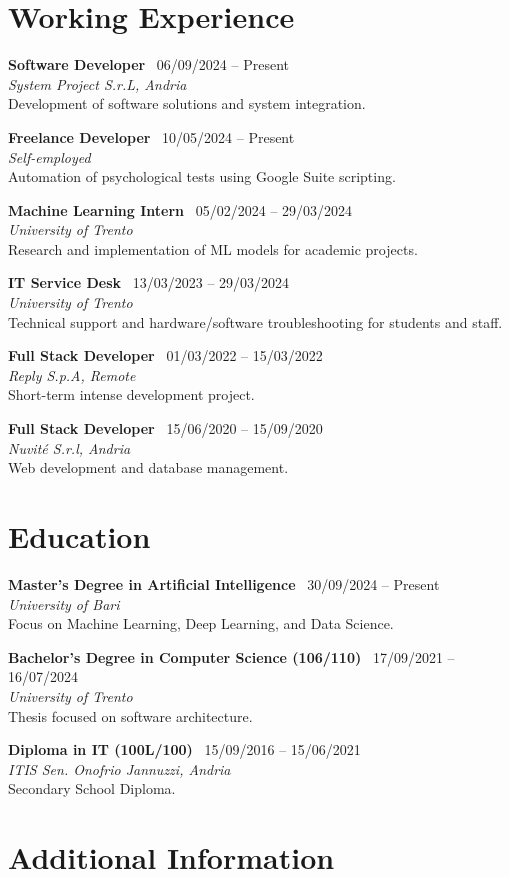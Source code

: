 \documentclass[11pt, a4paper]{article}
\newcommand{\workentry}[4]{
    \noindent \textbf{#2} \hfill {\color{darkgrey}\footnotesize \faCalendar* \ #1} \\
    {\color{primary}\textit{#3}} \vspace{0.3em} \\
    {\small #4} \vspace{4mm}
}
\newcommand{\eduentry}[4]{
    \noindent \textbf{#2} \hfill {\color{darkgrey}\footnotesize \faCalendar* \ #1} \\
    {\color{primary}\textit{#3}} \vspace{0.3em} \\
    {\small #4} \vspace{4mm}
}
\begin{document}
\section{Working Experience}

\workentry{06/09/2024 -- Present}
{Software Developer}
{System Project S.r.L, Andria}
{Development of software solutions and system integration.}

\workentry{10/05/2024 -- Present}
{Freelance Developer}
{Self-employed}
{Automation of psychological tests using Google Suite scripting.}

\workentry{05/02/2024 -- 29/03/2024}
{Machine Learning Intern}
{University of Trento}
{Research and implementation of ML models for academic projects.}

\workentry{13/03/2023 -- 29/03/2024}
{IT Service Desk}
{University of Trento}
{Technical support and hardware/software troubleshooting for students and staff.}

\workentry{01/03/2022 -- 15/03/2022}
{Full Stack Developer}
{Reply S.p.A, Remote}
{Short-term intense development project.}

\workentry{15/06/2020 -- 15/09/2020}
{Full Stack Developer}
{Nuvité S.r.l, Andria}
{Web development and database management.}

\section{Education}

\eduentry{30/09/2024 -- Present}
{Master's Degree in Artificial Intelligence}
{University of Bari}
{Focus on Machine Learning, Deep Learning, and Data Science.}

\eduentry{17/09/2021 -- 16/07/2024}
{Bachelor's Degree in Computer Science (106/110)}
{University of Trento}
{Thesis focused on software architecture.}

\eduentry{15/09/2016 -- 15/06/2021}
{Diploma in IT (100L/100)}
{ITIS Sen. Onofrio Jannuzzi, Andria}
{Secondary School Diploma.}

\section{Additional Information}
\end{document}
